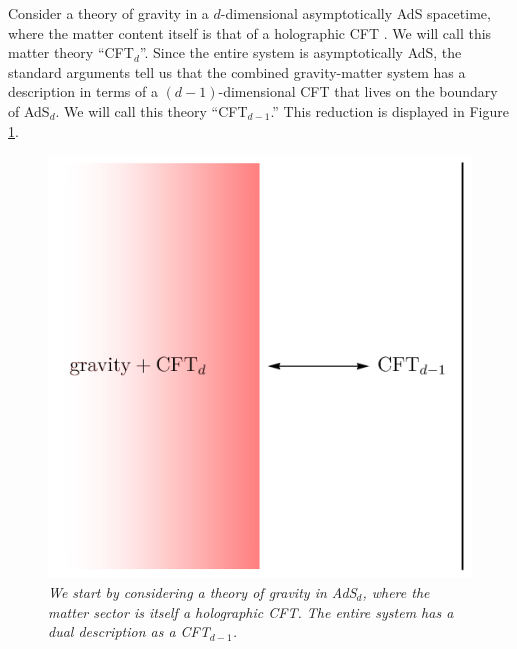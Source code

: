 \documentclass[12pt]{article}
\begin{document}
Consider a theory of gravity in a $d$-dimensional asymptotically AdS spacetime, where the matter content itself is that of a holographic CFT \cite{Almheiri:2019psf}.   We will call this matter theory  ``CFT$_d$''. 
Since the entire system is asymptotically AdS, the standard arguments tell us that the combined gravity-matter system has a description in terms of a $(d-1)$-dimensional CFT that lives on the boundary of AdS$_d$. We will call this theory ``CFT$_{d-1}$.''  This reduction is displayed in Figure \ref{figholographicrest1}.
\begin{figure}[!ht]
\begin{center}
\includegraphics[height=0.4\textheight]{boundaryreduction.pdf}
\caption{\em We start by considering a theory of gravity in AdS$_d$, where the matter sector is itself a holographic CFT. The entire system has a dual description as a CFT$_{d-1}$. \label{figholographicrest1}} 
\end{center}
\end{figure}
\end{document}
